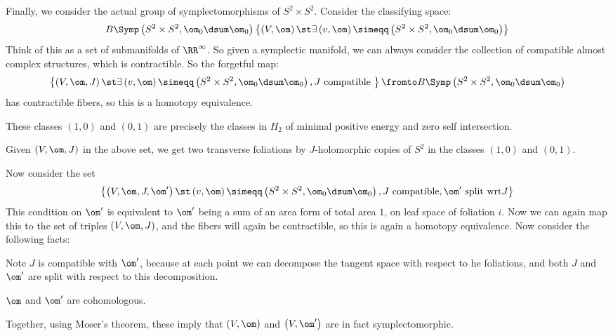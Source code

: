 \documentclass{amsart}
\begin{document}
Finally, we consider the actual group of symplectomorphisms of
$S^2 \times S^2$.
Consider the classifying space:
\begin{equation}
B\Symp\left( S^2 \times S^2 , \om_0 \dsum \om_0 \right)
\left\{  \left( V, \om \right) \st \exists
\left( v, \om \right) \simeqq \left( S^2 \times S^2 , \om_0 \dsum \om_0 \right)\right\}
\end{equation}
Think of this as a set of submanifolds of $\RR^\infty$. 
So given a symplectic manifold, we can always consider the collection of compatible almost
complex structures, which
is contractible. So the forgetful map:
\begin{equation}
\left\{  \left( V, \om , J\right) \st \exists
\left( v, \om \right) \simeqq \left( S^2 \times S^2 , \om_0 \dsum \om_0 \right), J\text{ compatible }\right\}
\fromto B\Symp\left( S^2 \times S^2 , \om_0\dsum \om_0 \right)
\end{equation}
has contractible fibers, so this is a homotopy equivalence.

\begin{rmk}
These classes $\left( 1,0 \right)$ and $\left( 0,1 \right)$ 
are precisely the classes in $H_2$ of minimal positive energy and zero 
self intersection.
\end{rmk}

Given $\left( V , \om , J \right)$ in the above set, we get
two transverse foliations by $J$-holomorphic copies of $S^2$
in the classes $\left( 1,0 \right)$ and $\left( 0,1 \right)$.

Now consider the set
\begin{equation}
\left\{ \left( V , \om , J , \om' \right) \st \left( v,\om \right) \simeqq
\left( S^2 \times S^2 , \om_0 \dsum \om_0 \right) , J\text{ compatible},
\om' \text{ split wrt} J\right\}
\end{equation}
This condition on $\om'$ is equivalent to $\om'$ being a sum of an 
area form of total area $1$, on leaf space of foliation $i$.
Now we can again map this to the set of triples $\left( V , \om , J \right)$,
and the fibers will again be contractible, so this is again a homotopy equivalence.
Now consider the following facts:
\begin{fact}
\item Note $J$ is compatible with $\om'$, because at each point
we can decompose the tangent space with respect to he foliations, 
and both $J$ and $\om'$ are split with respect to this decomposition.
\item $\om$ and $\om'$ are cohomologous.
\end{fact}
Together, using Moser's theorem,
these imply that 
$\left( V , \om \right)$ and $\left( V , \om' \right)$
are in fact symplectomorphic.
\end{document}
